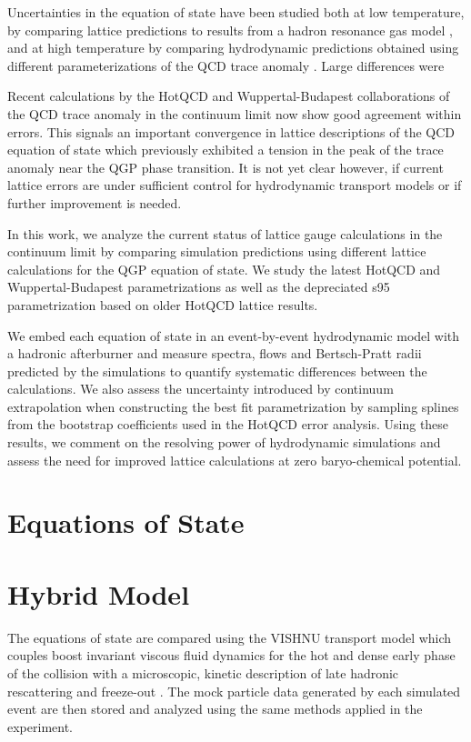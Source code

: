 \documentclass[aps,prc,reprint,amsmath,nofootinbib,superscriptaddress]{revtex4-1}
\begin{document}
Uncertainties in the equation of state have been studied both at low temperature, by comparing lattice predictions to results from a hadron 
resonance gas model \cite{Huovinen:2009yb}, and at high temperature by comparing hydrodynamic predictions obtained using different 
parameterizations of the QCD trace anomaly \cite{Huovinen:2005gy, Huovinen:2009yb}. Large differences were 

Recent calculations by the HotQCD and Wuppertal-Budapest collaborations of the QCD trace anomaly in the continuum limit now show good agreement 
within errors. This signals an important convergence in lattice descriptions of the QCD equation of state which previously exhibited a tension 
in the peak of the trace anomaly near the QGP phase transition. It is not yet clear however, if current lattice errors are under sufficient 
control for hydrodynamic transport models or if further improvement is needed.  

In this work, we analyze the current status of lattice gauge calculations in the continuum limit by comparing simulation predictions using 
different lattice calculations for the QGP equation of state. We study the latest HotQCD and Wuppertal-Budapest parametrizations as well as 
the depreciated s95 parametrization based on older HotQCD lattice results. 

We embed each equation of state in an event-by-event hydrodynamic model with a hadronic afterburner and measure spectra, flows and Bertsch-Pratt 
radii predicted by the simulations to quantify systematic differences between the calculations. We also assess the uncertainty introduced by 
continuum extrapolation when constructing the best fit parametrization by sampling splines from the bootstrap coefficients used in the HotQCD 
error analysis. Using these results, we comment on the resolving power of hydrodynamic simulations and assess the need for improved lattice 
calculations at zero baryo-chemical potential.

\section{Equations of State}

\section{Hybrid Model}

The equations of state are compared using the VISHNU transport model which couples boost invariant viscous fluid dynamics \cite{?} for the hot 
and dense early phase of the collision with a microscopic, kinetic description of late hadronic rescattering and freeze-out \cite{?}. The mock 
particle data generated by each simulated event are then stored and analyzed using the same methods applied in the experiment.
\end{document}
